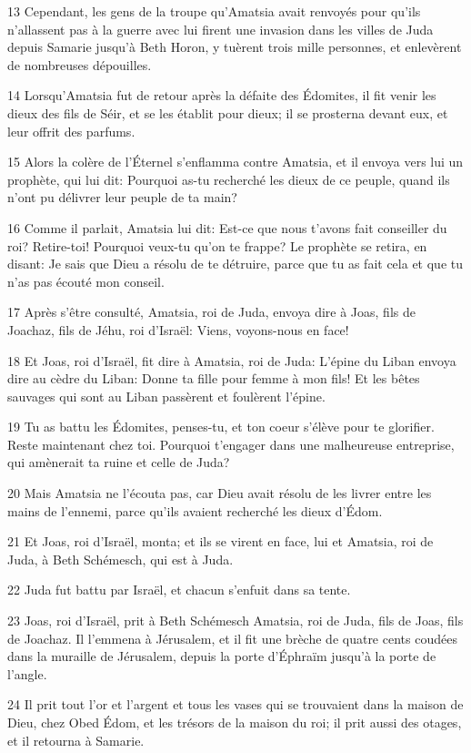 \par 13 Cependant, les gens de la troupe qu'Amatsia avait renvoyés pour qu'ils n'allassent pas à la guerre avec lui firent une invasion dans les villes de Juda depuis Samarie jusqu'à Beth Horon, y tuèrent trois mille personnes, et enlevèrent de nombreuses dépouilles.
\par 14 Lorsqu'Amatsia fut de retour après la défaite des Édomites, il fit venir les dieux des fils de Séir, et se les établit pour dieux; il se prosterna devant eux, et leur offrit des parfums.
\par 15 Alors la colère de l'Éternel s'enflamma contre Amatsia, et il envoya vers lui un prophète, qui lui dit: Pourquoi as-tu recherché les dieux de ce peuple, quand ils n'ont pu délivrer leur peuple de ta main?
\par 16 Comme il parlait, Amatsia lui dit: Est-ce que nous t'avons fait conseiller du roi? Retire-toi! Pourquoi veux-tu qu'on te frappe? Le prophète se retira, en disant: Je sais que Dieu a résolu de te détruire, parce que tu as fait cela et que tu n'as pas écouté mon conseil.
\par 17 Après s'être consulté, Amatsia, roi de Juda, envoya dire à Joas, fils de Joachaz, fils de Jéhu, roi d'Israël: Viens, voyons-nous en face!
\par 18 Et Joas, roi d'Israël, fit dire à Amatsia, roi de Juda: L'épine du Liban envoya dire au cèdre du Liban: Donne ta fille pour femme à mon fils! Et les bêtes sauvages qui sont au Liban passèrent et foulèrent l'épine.
\par 19 Tu as battu les Édomites, penses-tu, et ton coeur s'élève pour te glorifier. Reste maintenant chez toi. Pourquoi t'engager dans une malheureuse entreprise, qui amènerait ta ruine et celle de Juda?
\par 20 Mais Amatsia ne l'écouta pas, car Dieu avait résolu de les livrer entre les mains de l'ennemi, parce qu'ils avaient recherché les dieux d'Édom.
\par 21 Et Joas, roi d'Israël, monta; et ils se virent en face, lui et Amatsia, roi de Juda, à Beth Schémesch, qui est à Juda.
\par 22 Juda fut battu par Israël, et chacun s'enfuit dans sa tente.
\par 23 Joas, roi d'Israël, prit à Beth Schémesch Amatsia, roi de Juda, fils de Joas, fils de Joachaz. Il l'emmena à Jérusalem, et il fit une brèche de quatre cents coudées dans la muraille de Jérusalem, depuis la porte d'Éphraïm jusqu'à la porte de l'angle.
\par 24 Il prit tout l'or et l'argent et tous les vases qui se trouvaient dans la maison de Dieu, chez Obed Édom, et les trésors de la maison du roi; il prit aussi des otages, et il retourna à Samarie.
